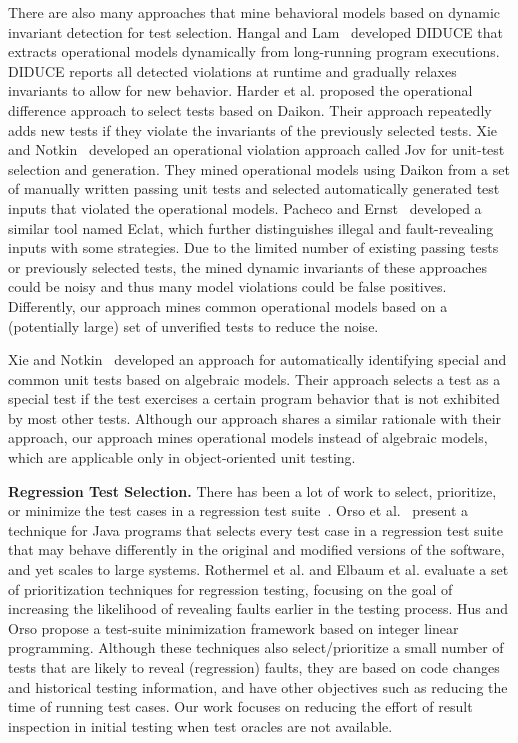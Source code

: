 \documentclass{sig-alternate}
\begin{document}
There are also many approaches that mine behavioral models based on
dynamic invariant detection for test selection. Hangal and
Lam~\cite{Hangal02} developed DIDUCE that extracts operational
models dynamically from long-running program executions. DIDUCE
reports all detected violations at runtime and gradually relaxes
invariants to allow for new behavior. Harder et al. \cite{Harder03}
proposed the operational difference approach to select tests based
on Daikon. Their approach repeatedly adds new tests if they violate
the invariants of the previously selected tests. Xie and
Notkin~\cite{Xie03} developed an operational violation approach
called Jov for unit-test selection and generation. They mined
operational models using Daikon from a set of manually written
passing unit tests and selected automatically generated test inputs
that violated the operational models. Pacheco and
Ernst~\cite{Pacheco05} developed a similar tool named Eclat, which
further distinguishes illegal and fault-revealing inputs with some
strategies. Due to the limited number of existing passing tests or
previously selected tests, the mined dynamic invariants of these
approaches could be noisy and thus many model violations could be
false positives. Differently, our approach mines common operational
models based on a (potentially large) set of unverified tests to
reduce the noise.

Xie and Notkin~\cite{Xie05} developed an approach for automatically
identifying special and common unit tests based on algebraic models.
Their approach selects a test as a special test if the test
exercises a certain program behavior that is not exhibited by most
other tests. Although our approach shares a similar rationale with
their approach, our approach mines operational models instead of
algebraic models, which are applicable only in object-oriented unit
testing.


\textbf{Regression Test Selection.} There has been a lot of work to
select, prioritize, or minimize the test cases in a regression test
suite~\cite{Elbaum02,Hsu09,Orso04,Rothermel01}. Orso et
al.~\cite{Orso04} present a technique for Java programs that selects
every test case in a regression test suite that may behave
differently in the original and modified versions of the software,
and yet scales to large systems. Rothermel et al. \cite{Rothermel01}
and Elbaum et al. \cite{Elbaum02} evaluate a set of prioritization
techniques for regression testing, focusing on the goal of
increasing the likelihood of revealing faults earlier in the testing
process. Hus and Orso \cite{Hsu09} propose a test-suite minimization
framework based on integer linear programming. Although these
techniques also select/prioritize a small number of tests that are
likely to reveal (regression) faults, they are based on code changes
and historical testing information, and have other objectives such
as reducing the time of running test cases. Our work focuses on
reducing the effort of result inspection in initial testing when
test oracles are not available.
\end{document}
